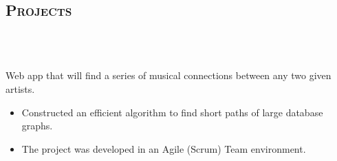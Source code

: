 \begin{resume}
\section{\textsc{Projects}}


\begin{formatb}
  \\
  \body\\
\end{formatb}

\begin{position}
  Web app that will find a series of musical connections between any two given artists. 
\end{position}
\begin{itemize}
\item Constructed an efficient algorithm to find short paths of large database graphs.
\end{itemize}
\begin{itemize}
\item The project was developed in an Agile (Scrum) Team environment.
\end{itemize}



\end{resume}
